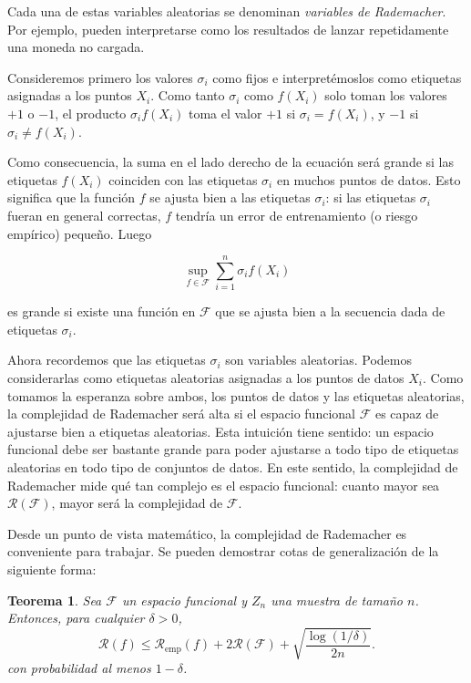 \documentclass{report}
\newtheorem{thm}{Teorema}[section]
\begin{document}
Cada una de estas variables aleatorias se denominan \textit{variables de Rademacher}.
Por ejemplo, pueden interpretarse como los resultados de lanzar repetidamente una moneda no cargada.

Consideremos primero los valores \(\sigma_i\) como fijos e interpretémoslos como etiquetas asignadas a los puntos \(X_i\). Como tanto
\(\sigma_i\) como \(f(X_i)\) solo toman los valores \(+1\) o \(-1\), el producto \(\sigma_i f(X_i)\) toma el
valor \(+1\) si \(\sigma_i = f(X_i)\), y \(-1\) si \(\sigma_i \neq f(X_i)\).

Como consecuencia, la suma en el lado derecho de la ecuación será grande si las etiquetas \(f(X_i)\)
coinciden con las etiquetas \(\sigma_i\) en muchos puntos de datos. Esto significa que la función \(f\)
se ajusta bien a las etiquetas \(\sigma_i\): si las etiquetas \(\sigma_i\) fueran en general correctas,
\(f\) tendría un error de entrenamiento (o riesgo empírico) pequeño. Luego

\[
\sup_{f \in \mathcal{F}} \sum_{i=1}^{n} \sigma_i f(X_i)
\]

es grande si existe una función en \(\mathcal{F}\) que se ajusta bien a la secuencia dada de etiquetas \(\sigma_i\).

Ahora recordemos que las etiquetas \(\sigma_i\) son variables aleatorias. Podemos considerarlas
como etiquetas aleatorias asignadas a los puntos de datos \(X_i\). Como tomamos la esperanza sobre ambos, los
puntos de datos y las etiquetas aleatorias, la complejidad de Rademacher será alta si el espacio funcional
\(\mathcal{F}\) es capaz de ajustarse bien a etiquetas aleatorias. Esta intuición tiene sentido: un espacio
funcional debe ser bastante grande para poder ajustarse a todo tipo de etiquetas aleatorias en todo tipo de
conjuntos de datos. En este sentido, la complejidad de Rademacher mide qué tan complejo es el espacio
funcional: cuanto mayor sea \(\mathscr{R}(\mathcal{F})\), mayor será la complejidad de \(\mathcal{F}\).

Desde un punto de vista matemático, la complejidad de Rademacher es conveniente para trabajar. Se pueden
demostrar cotas de generalización de la siguiente forma:
\begin{thm}
    Sea $\mathcal{F}$ un espacio funcional y $Z_n$ una muestra de tamaño $n$. Entonces, para cualquier $\delta > 0$,
\[
\mathcal{R}(f) \leq \mathcal{R}_{\text{emp}}(f) + 2\mathscr{R}(\mathcal{F}) + \sqrt{\frac{\log(1/\delta)}{2n}}.
\]
con probabilidad al menos \(1 - \delta\).\\
\end{thm}
\end{document}
